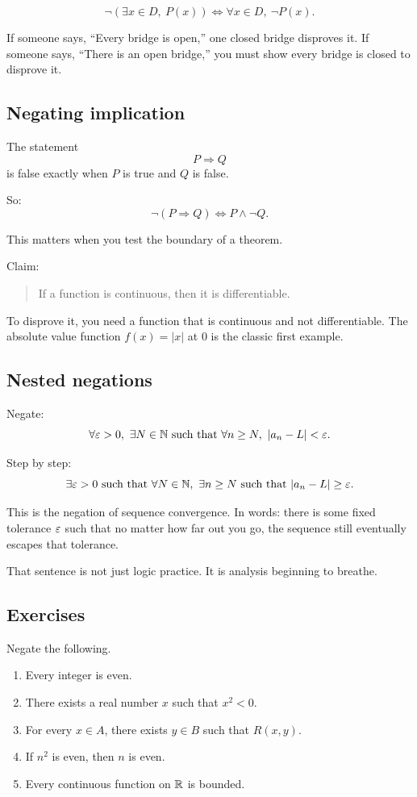 \documentclass[11pt]{article}
\begin{document}
\[
\neg(\exists x\in D,\ P(x)) \Longleftrightarrow \forall x\in D,\ \neg P(x).
\]

If someone says, ``Every bridge is open,'' one closed bridge disproves it. If someone says, ``There is an open bridge,'' you must show every bridge is closed to disprove it.

\subsection{Negating implication}

The statement
\[
P\Rightarrow Q
\]
is false exactly when $P$ is true and $Q$ is false.

So:
\[
\neg(P\Rightarrow Q) \Longleftrightarrow P\land \neg Q.
\]

This matters when you test the boundary of a theorem.

Claim:

\begin{quote}
If a function is continuous, then it is differentiable.
\end{quote}

To disprove it, you need a function that is continuous and not differentiable. The absolute value function $f(x)=|x|$ at $0$ is the classic first example.

\subsection{Nested negations}

Negate:
\[
\forall \eps>0,\ \exists N\in\N \text{ such that } \forall n\geq N,\ |a_n-L|<\eps.
\]

Step by step:
\[
\exists \varepsilon>0 \text{ such that } \forall N\in\mathbb{N},\ \exists n\geq N \text{ such that } |a_n-L|\geq \varepsilon.
\]

This is the negation of sequence convergence. In words: there is some fixed tolerance $\varepsilon$ such that no matter how far out you go, the sequence still eventually escapes that tolerance.

That sentence is not just logic practice. It is analysis beginning to breathe.

\subsection{Exercises}

Negate the following.

\begin{enumerate}
\item Every integer is even.
\item There exists a real number $x$ such that $x^2<0$.
\item For every $x\in A$, there exists $y\in B$ such that $R(x,y)$.
\item If $n^2$ is even, then $n$ is even.
\item Every continuous function on $\mathbb{R}$ is bounded.
\end{enumerate}
\end{document}
